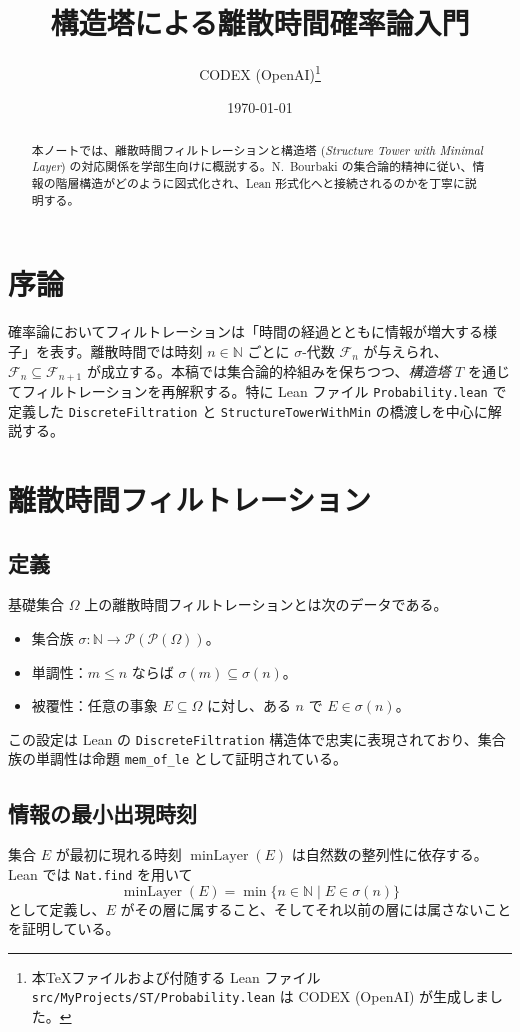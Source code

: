 \documentclass[12pt]{ltjsarticle}
\title{構造塔による離散時間確率論入門}
\author{CODEX (OpenAI)\thanks{本TeXファイルおよび付随する Lean ファイル \texttt{src/MyProjects/ST/Probability.lean} は CODEX (OpenAI) が生成しました。}}
\date{\today}
\begin{document}
\maketitle

\begin{abstract}
本ノートでは、離散時間フィルトレーションと構造塔 (\textit{Structure Tower with Minimal Layer}) の対応関係を学部生向けに概説する。N.~Bourbaki の集合論的精神に従い、情報の階層構造がどのように図式化され、Lean 形式化へと接続されるのかを丁寧に説明する。
\end{abstract}

\tableofcontents

\section{序論}
確率論においてフィルトレーションは「時間の経過とともに情報が増大する様子」を表す。離散時間では時刻 $n \in \mathbb{N}$ ごとに $\sigma$-代数 $\mathcal{F}_n$ が与えられ、$\mathcal{F}_n \subseteq \mathcal{F}_{n+1}$ が成立する。本稿では集合論的枠組みを保ちつつ、\emph{構造塔} $T$ を通じてフィルトレーションを再解釈する。特に Lean ファイル \texttt{Probability.lean} で定義した \texttt{DiscreteFiltration} と \texttt{StructureTowerWithMin} の橋渡しを中心に解説する。

\section{離散時間フィルトレーション}
\subsection{定義}
基礎集合 $\Omega$ 上の離散時間フィルトレーションとは次のデータである。
\begin{itemize}
  \item 集合族 $\sigma : \mathbb{N} \to \mathcal{P}(\mathcal{P}(\Omega))$。
  \item 単調性：$m \leq n$ ならば $\sigma(m) \subseteq \sigma(n)$。
  \item 被覆性：任意の事象 $E \subseteq \Omega$ に対し、ある $n$ で $E \in \sigma(n)$。
\end{itemize}
この設定は Lean の \texttt{DiscreteFiltration} 構造体で忠実に表現されており、集合族の単調性は命題 \texttt{mem\_of\_le} として証明されている。

\subsection{情報の最小出現時刻}
集合 $E$ が最初に現れる時刻 $\operatorname{minLayer}(E)$ は自然数の整列性に依存する。Lean では \texttt{Nat.find} を用いて
\[
  \operatorname{minLayer}(E) = \min \{ n \in \mathbb{N} \mid E \in \sigma(n)\}
\]
として定義し、$E$ がその層に属すること、そしてそれ以前の層には属さないことを証明している。
\end{document}
